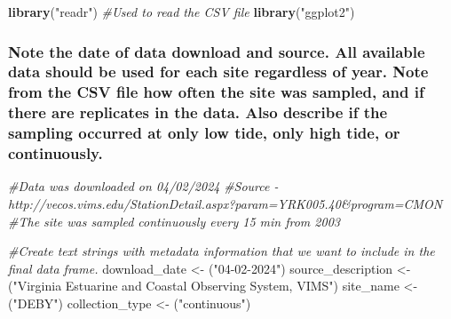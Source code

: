 \documentclass[
]{article}
\newenvironment{Shaded}{\begin{snugshade}}{\end{snugshade}}
\newcommand{\CommentTok}[1]{\textcolor[rgb]{0.56,0.35,0.01}{\textit{#1}}}
\newcommand{\FunctionTok}[1]{\textcolor[rgb]{0.13,0.29,0.53}{\textbf{#1}}}
\newcommand{\NormalTok}[1]{#1}
\newcommand{\OtherTok}[1]{\textcolor[rgb]{0.56,0.35,0.01}{#1}}
\newcommand{\StringTok}[1]{\textcolor[rgb]{0.31,0.60,0.02}{#1}}
\begin{document}
\begin{Shaded}
\begin{Highlighting}[]
\FunctionTok{library}\NormalTok{(}\StringTok{"readr"}\NormalTok{) }\CommentTok{\#Used to read the CSV file}
\FunctionTok{library}\NormalTok{(}\StringTok{"ggplot2"}\NormalTok{) }
\end{Highlighting}
\end{Shaded}

\hypertarget{note-the-date-of-data-download-and-source.-all-available-data-should-be-used-for-each-site-regardless-of-year.-note-from-the-csv-file-how-often-the-site-was-sampled-and-if-there-are-replicates-in-the-data.-also-describe-if-the-sampling-occurred-at-only-low-tide-only-high-tide-or-continuously.}{%
\subsubsection{Note the date of data download and source. All available
data should be used for each site regardless of year. Note from the CSV
file how often the site was sampled, and if there are replicates in the
data. Also describe if the sampling occurred at only low tide, only high
tide, or
continuously.}\label{note-the-date-of-data-download-and-source.-all-available-data-should-be-used-for-each-site-regardless-of-year.-note-from-the-csv-file-how-often-the-site-was-sampled-and-if-there-are-replicates-in-the-data.-also-describe-if-the-sampling-occurred-at-only-low-tide-only-high-tide-or-continuously.}}

\begin{Shaded}
\begin{Highlighting}[]
\CommentTok{\#Data was downloaded on 04/02/2024}
\CommentTok{\#Source {-} http://vecos.vims.edu/StationDetail.aspx?param=YRK005.40\&program=CMON}
\CommentTok{\#The site was sampled continuously every 15 min from 2003}

\CommentTok{\#Create text strings with metadata information that we want to include in the final data frame. }
\NormalTok{download\_date }\OtherTok{\textless{}{-}}\NormalTok{ (}\StringTok{"04{-}02{-}2024"}\NormalTok{)}
\NormalTok{source\_description }\OtherTok{\textless{}{-}}\NormalTok{ (}\StringTok{"Virginia Estuarine and Coastal Observing System, VIMS"}\NormalTok{)}
\NormalTok{site\_name }\OtherTok{\textless{}{-}}\NormalTok{ (}\StringTok{"DEBY"}\NormalTok{) }
\NormalTok{collection\_type }\OtherTok{\textless{}{-}}\NormalTok{ (}\StringTok{"continuous"}\NormalTok{)}
\end{Highlighting}
\end{Shaded}
\end{document}
